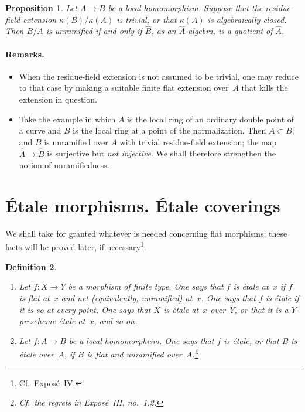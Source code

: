\documentclass[11pt,oneside]{amsbook}
\newtheorem{proposition}{Proposition}[section]
\newtheorem{definition}[proposition]{Definition}
\begin{document}
\begin{proposition}
\label{I.3.7}
Let \(A\to B\) be a local homomorphism.  Suppose that the residue-field
extension \(\kappa(B)/\kappa(A)\) is trivial, or that \(\kappa(A)\) is
algebraically closed.  Then \(B/A\) is unramified if and only if
\(\widehat B\), as an \(\widehat A\)-algebra, is a quotient of
\(\widehat A\).
\end{proposition}

\paragraph{Remarks.}
\begin{itemize}
\item When the residue-field extension is not assumed to be trivial, one may
  reduce to that case by making a suitable finite flat extension over~\(A\)
  that kills the extension in question.
\item Take the example in which \(A\) is the local ring of an ordinary
  double point of a curve and \(B\) is the local ring at a point of the
  normalization.  Then \(A\subset B\), and \(B\) is unramified
  over \(A\) with
  trivial residue-field extension; the map
  \(\widehat A\to\widehat B\) is surjective but \emph{not injective}.
  We shall therefore strengthen the notion of unramifiedness.
\end{itemize}

\section{Étale morphisms. Étale coverings}
\label{I.4}

We shall take for granted whatever is needed concerning flat morphisms; these
facts will be proved later, if necessary\footnote{Cf.\ Expos\'e~IV.}.

\begin{definition}
\label{I.4.1}
\begin{enumerate}
\item[(a)] Let \(f\colon X\to Y\) be a morphism of finite type.  One says
  that \(f\) is \emph{étale} at~\(x\) if \(f\) is flat at~\(x\) and net
  (equivalently, unramified) at~\(x\).  One says that \(f\) is étale if it
  is so at every point.  One says that \(X\) is étale at~\(x\) over~\(Y\),
  or that it is a \(Y\)-prescheme étale at~\(x\), and so on.
\item[(b)] Let \(f\colon A\to B\) be a local homomorphism.  One says that
  \(f\) is étale, or that \(B\) is étale over~\(A\), if \(B\) is flat and
  unramified over~\(A\).\footnote{Cf.\ the regrets in Expos\'e~III,
  no.~1.2.}
\end{enumerate}
\end{definition}
\end{document}
